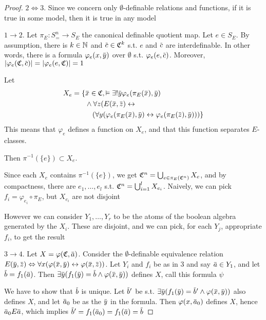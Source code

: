 \documentclass[11pt]{article}
\begin{document}
\begin{proof}
\(2\Leftrightarrow 3\). Since we concern only \(\emptyset\)-definable relations and functions, if it is true in some
model, then it is true in any model

\(1\to 2\). Let \(\pi_E:S_=^n\to S_E\) the canonical definable quotient map. Let \(e\in S_E\). By
assumption, there is \(k\in\mathbb{N}\) and \(\barc\in\fC^k\) s.t. \(e\) and \(\barc\) are interdefinable. In
other words, there is a formula \(\varphi_e(x,\bary)\) over \(\emptyset\) s.t. \(\varphi_e(e,\barc)\).
Moreover, \(\abs{\varphi_e(\fC,\barc)}=\abs{\varphi_e(e,\fC)}=1\)

Let
\begin{align*}
X_e=\{&\barx\in\fC,\vDash\exists!\bary\varphi_e(\pi_E(\barx),\bary)\\&\wedge\forall z(E(\barx,\barz)\leftrightarrow\\&\quad(\forall y(\varphi_e(\pi_E(\barx),\bary)\leftrightarrow\varphi_e(\pi_E(\barz),\bary)))\}
\end{align*}
This means that \(\varphi_e\) defines a function on \(X_e\), and that this function
separates \(E\)-classes.

Then \(\pi^{-1}(\{e\})\subset X_e\).

Since each \(X_e\) contains \(\pi^{-1}(\{e\})\), we get \(\mathfrak{C}^n=\bigcup_{e\in\pi_E(\mathfrak{C}^n)}X_e\), and by compactness,
there are \(e_1,\dots,e_l\) s.t. \(\mathfrak{C}^n=\bigcup_{i=1}^lX_{e_i}\).
Naively, we can pick \(f_i=\varphi_{e_i}\circ\pi_E\), but \(X_{e_i}\) are not disjoint

However we can consider \(Y_1,\dots,Y_r\) to be the atoms of the boolean algebra generated by the \(X_i\).
These are disjoint, and we can pick, for each \(Y_j\), appropriate \(f_i\), to get the result

\(3\to 4\). Let \(X=\varphi(\fC,\bara)\). Consider the \(\emptyset\)-definable equivalence
relation \(E(\bary,\barz)\Leftrightarrow\forall x(\varphi(\barx,\bary)\leftrightarrow\varphi(\barx,\barz))\). Let \(Y_i\) and \(f_i\) be as in 3
and say \(\bara\in Y_1\), and let \(\barb=f_1(\bara)\).
Then \(\exists\bary(f_1(\bary)=\barb\wedge\varphi(\barx,\bary))\) defines \(X\), call this formula \(\psi\)

We have to show that \(\barb\) is unique. Let \(\barb'\) be
s.t. \(\exists\bary(f_1(\bary)=\barb'\wedge\varphi(\barx,\bary))\) also defines \(X\), and let \(\bara_0\) be as
the \(\bary\) in the formula. Then \(\varphi(x,\bara_0)\) defines \(X\), hence \(\bara_0E\bara\),
which implies \(\barb'=f_1(\bara_0)=f_1(\bara)=\barb\)


\end{proof}
\end{document}
